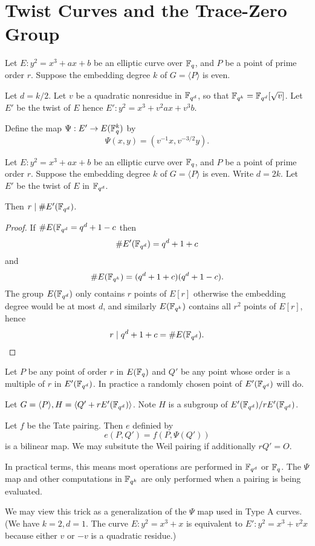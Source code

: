 \section {Twist Curves and the Trace-Zero Group}

Let $E : y^2 = x^3 + a x + b$ be an elliptic curve over $\mathbb{F}_q$,
and $P$ be a point of prime order $r$.
Suppose the embedding degree $k$ of $G = \langle P \rangle$ is even.

Let $d = k / 2$. Let $v$ be a quadratic nonresidue in $\mathbb{F}_{q^d}$,
so that $\mathbb{F}_{q^k} = \mathbb{F}_{q^d}[\sqrt{v}]$.
Let $E'$ be the twist of $E$ hence
$E' : y^2 = x^3 + v^2 a x + v^3 b$.

Define the map $\Psi:E'\rightarrow E(\mathbb{F}_q^k)$ by
\[ \Psi(x,y) = (v^{-1}x, v^{-3/2}y) . \]

\begin{theorem}
Let $E : y^2 = x^3 + a x + b$ be an elliptic curve over $\mathbb{F}_q$,
and $P$ be a point of prime order $r$.
Suppose the embedding degree $k$ of $G = \langle P \rangle$ is even.
Write $d = 2k$. Let $E'$ be the twist of $E$ in $\mathbb{F}_{q^d}$.

Then $r \mid \#E'(\mathbb{F}_{q^d})$.
\end{theorem}

\begin{proof}
If $\#E(\mathbb{F}_{q^d} = q^d + 1 - c$ then
\[ \#E'(\mathbb{F}_{q^d}) = q^d + 1 + c \]
and
\[ \#E(\mathbb{F}_{q^k}) = (q^{d} + 1 + c)(q^{d} + 1 - c) . \]
The group $E(\mathbb{F}_{q^d})$ only contains $r$ points of $E[r]$ otherwise
the embedding degree would be at most $d$, and similarly
$E(\mathbb{F}_{q^k})$ contains all $r^2$ points of $E[r]$,
hence
\[ r \mid q^{d} + 1 + c = \#E(\mathbb{F}_{q^d}) .\]
\end{proof}

Let $P$ be any point of order $r$ in $E(\mathbb{F}_q)$ and
$Q'$ be any point whose order is a multiple of $r$ in $E'(\mathbb{F}_{q^d})$.
In practice a randomly chosen point of $E'(\mathbb{F}_{q^d})$ will do.

Let $G = \langle P \rangle, H = \langle Q' + r E'(\mathbb{F}_{q^d}) \rangle$.
Note $H$ is a subgroup of $E'(\mathbb{F}_{q^d}) / rE'(\mathbb{F}_{q^d})$.

Let $f$ be the Tate pairing.
Then $e$ definied by
\[e(P,Q') = f(P, \Psi(Q')) \]
is a bilinear map.
We may subsitute the Weil pairing if additionally
$r Q' = O$.

In practical terms, this means most operations are performed in
$\mathbb{F}_{q^d}$  or $\mathbb{F}_q$. The $\Psi$ map and
other computations in $\mathbb{F}_{q^k}$ are only performed
when a pairing is being evaluated.

We may view this trick as a
generalization of the $\Psi$ map used in Type A curves.
(We have $k =2 , d = 1$.
The curve $E : y^2 = x^3 + x$ is equivalent to $E' : y^2 = x^3 + v^2 x$
because either $v$ or $-v$ is a quadratic residue.)

